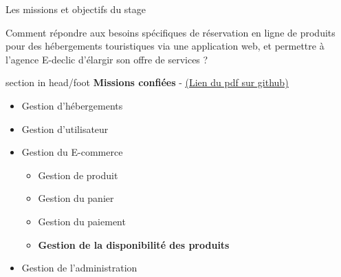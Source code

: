 \documentclass{beamer}
\begin{document}
\begin{frame}{Les missions et objectifs du stage}

	Comment répondre aux besoins spécifiques de réservation en ligne de produits pour des hébergements touristiques via une application web, et permettre à l’agence E-declic d’élargir son offre de services ?
			
	\begin{center}
  		\begin{minipage}{0.9\textwidth}
			\begin{beamercolorbox}[wd=\paperwidth,ht=1.5em,dp=0.5em,leftskip=0.5cm]{section in head/foot}
  				\large \textbf{Missions confiées} - \href{https://github.com/Matteo-K/Soutenance_E-delic/blob/main/pdf/cc-painspizzas-camping.pdf}{\underline{(Lien du pdf sur github)}}
			\end{beamercolorbox}
			\begin{itemize}
				\item<1-> Gestion d'hébergements
				\item<1-> Gestion d'utilisateur
				\item<2-> Gestion du E-commerce
				\begin{itemize}
					\item Gestion de produit
					\item Gestion du panier
					\item Gestion du paiement
					\item \textbf{Gestion de la disponibilité des produits}
				\end{itemize}
				\item<3-> Gestion de l'administration
			\end{itemize}
  		\end{minipage}
  		\vspace{1cm}
	\end{center}
	\vfill
\end{frame}
\end{document}

